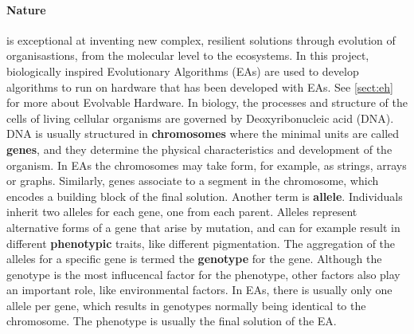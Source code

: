 \paragraph{Nature} is exceptional at inventing new complex, resilient solutions through evolution of organisastions, from the molecular level to the ecosystems.
In this project, biologically inspired Evolutionary Algorithms (EAs) are used to develop algorithms to run on hardware that has been developed with EAs.
See \vref{sect:eh} for more about Evolvable Hardware.
In biology, the processes and structure of the cells of living cellular organisms are governed by Deoxyribonucleic acid (DNA).
DNA is usually structured in \textbf{chromosomes} where the minimal units are called \textbf{genes}, and they determine the physical characteristics and development of the organism.
In EAs the chromosomes may take form, for example, as strings, arrays or graphs.
Similarly, genes associate to a segment in the chromosome, which encodes a building block of the final solution.
Another term is \textbf{allele}. Individuals inherit two alleles for each gene, one from each parent. Alleles represent alternative forms of a gene that arise by mutation, and can for example result in different \textbf{phenotypic} traits, like different pigmentation.
The aggregation of the alleles for a specific gene is termed the \textbf{genotype} for the gene.
Although the genotype is the most influcencal factor for the phenotype, other factors also play an important role, like environmental factors.
\cite{trefzer_evolvable_2015}
In EAs, there is usually only one allele per gene, which results in genotypes normally being identical to the chromosome.
The phenotype is usually the final solution of the EA.

